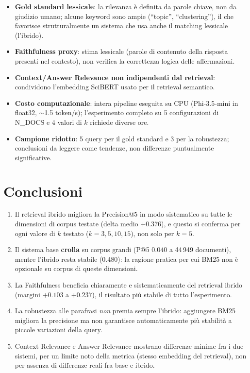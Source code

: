 \documentclass[12pt,a4paper]{article}
\begin{document}
\begin{itemize}
  \item \textbf{Gold standard lessicale}: la rilevanza \`e definita da parole chiave, non da giudizio umano; alcune keyword sono ampie (``topic'', ``clustering''), il che favorisce strutturalmente un sistema che usa anche il matching lessicale (l'ibrido).
  \item \textbf{Faithfulness proxy}: stima lessicale (parole di contenuto della risposta presenti nel contesto), non verifica la correttezza logica delle affermazioni.
  \item \textbf{Context/Answer Relevance non indipendenti dal retrieval}: condividono l'embedding SciBERT usato per il retrieval semantico.
  \item \textbf{Costo computazionale}: intera pipeline eseguita su CPU (Phi-3.5-mini in float32, ${\sim}$1.5 token/s); l'esperimento completo su 5 configurazioni di N\_DOCS e 4 valori di $k$ richiede diverse ore.
  \item \textbf{Campione ridotto}: 5 query per il gold standard e 3 per la robustezza; conclusioni da leggere come tendenze, non differenze puntualmente significative.
\end{itemize}

\section{Conclusioni}

\begin{enumerate}
  \item Il retrieval ibrido migliora la Precision@5 in modo sistematico su tutte le dimensioni di corpus testate (delta medio +0.376), e questo si conferma per ogni valore di $k$ testato ($k=3,5,10,15$), non solo per $k=5$.
  \item Il sistema base \textbf{crolla} su corpus grandi (P@5 $0.040$ a 44\,949 documenti), mentre l'ibrido resta stabile ($0.480$): la ragione pratica per cui BM25 non \`e opzionale su corpus di queste dimensioni.
  \item La Faithfulness beneficia chiaramente e sistematicamente del retrieval ibrido (margini $+0.103$ a $+0.237$), il risultato pi\`u stabile di tutto l'esperimento.
  \item La robustezza alle parafrasi \emph{non} premia sempre l'ibrido: aggiungere BM25 migliora la precisione ma non garantisce automaticamente pi\`u stabilit\`a a piccole variazioni della query.
  \item Context Relevance e Answer Relevance mostrano differenze minime fra i due sistemi, per un limite noto della metrica (stesso embedding del retrieval), non per assenza di differenze reali fra base e ibrido.
\end{enumerate}
\end{document}
